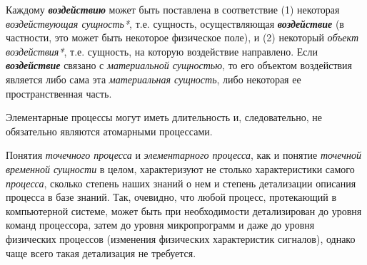 \begin{SCn}
\end{SCn}

Каждому \textbf{\textit{воздействию}} может быть поставлена в соответствие (1) некоторая \textit{воздействующая сущность*}, т.е. сущность, осуществляющая \textbf{\textit{воздействие}} (в частности, это может быть некоторое физическое поле), и (2) некоторый \textit{объект воздействия*}, т.е. сущность, на которую воздействие направлено. Если \textbf{\textit{воздействие}} связано с \textit{материальной сущностью}, то его объектом воздействия является либо сама эта \textit{материальная сущность}, либо некоторая ее пространственная часть.


\begin{SCn}
		
\end{SCn}

Элементарные процессы могут иметь длительность и, следовательно, не обязательно являются атомарными процессами.

Понятия \textit{точечного процесса} и \textit{элементарного процесса}, как и понятие \textit{точечной временной сущности} в целом, характеризуют не столько характеристики самого \textit{процесса}, сколько степень наших знаний о нем и степень детализации описания процесса в базе знаний. Так, очевидно, что любой процесс, протекающий в компьютерной системе, может быть при необходимости детализирован до уровня команд процессора, затем до уровня микропрограмм и даже до уровня физических процессов (изменения физических характеристик сигналов), однако чаще всего такая детализация не требуется.


